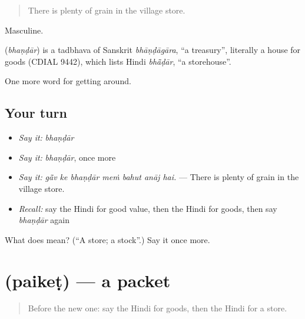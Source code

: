 \begin{quote}
There is plenty of grain in the village store.
\end{quote}

Masculine.

\begin{cousinweb}
\textbf{} (\emph{bhaṇḍār}) is a tadbhava of Sanskrit \emph{bhāṇḍāgāra}, \textquotedblleft{}a treasury\textquotedblright{}, literally a house for goods (CDIAL 9442), which lists Hindi \emph{bhā̃ḍār}, \textquotedblleft{}a storehouse\textquotedblright{}.
\end{cousinweb}

\begin{grammarlens}[title={What you've built}]
One more word for getting around.
\end{grammarlens}

\subsection*{Your turn}
\begin{itemize}
\raggedright
  \item \emph{Say it:} \emph{bhaṇḍār}
  \item \emph{Say it:} \emph{bhaṇḍār}, once more
  \item \emph{Say it:} \emph{gā̃v ke bhaṇḍār meṁ bahut anāj hai.} — There is plenty of grain in the village store.
  \item \emph{Recall:} say the Hindi for good value, then the Hindi for goods, then say \emph{bhaṇḍār} again
\end{itemize}

\begin{tcolorbox}[breakable,colback=teal!4,colframe=teal!35!black,title={Before you move on}]
What does  mean? (\textquotedblleft{}A store; a stock\textquotedblright{}.) Say it once more.
\end{tcolorbox}
\section[\texorpdfstring{\hi{पैकेट} (paikeṭ)}{पैकेट (paikeṭ)}]{ (paikeṭ) — a packet}

\label{lesson:HI-C432-paiket}



\begin{quote}
Before the new one: say the Hindi for goods, then the Hindi for a store.
\end{quote}


